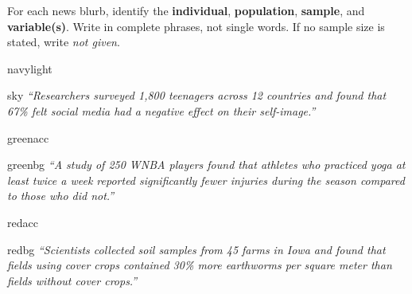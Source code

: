 \documentclass[10pt]{article}
\begin{document}
\namedateperiod

\vspace{0.1in}

\begin{tcolorbox}[colback=sky, colframe=navy, boxrule=0.8pt, arc=2mm,
    left=3mm, right=3mm, top=1.5mm, bottom=1.5mm]
\small For each news blurb, identify the \textbf{individual}, \textbf{population},
\textbf{sample}, and \textbf{variable(s)}. Write in complete phrases, not single words.
If no sample size is stated, write \textit{not given}.
\end{tcolorbox}

\vspace{0.14in}

\begin{blurbbox}[Study 1]{navylight}
\begin{headlinebox}{sky}
\small\textit{``Researchers surveyed 1{,}800 teenagers across 12 countries and
found that 67\% felt social media had a negative effect on their self-image.''}
\end{headlinebox}

\vspace{8pt}
\componenttable
\end{blurbbox}

\vspace{0.14in}

\begin{blurbbox}[Study 2]{greenacc}
\begin{headlinebox}{greenbg}
\small\textit{``A study of 250 WNBA players found that athletes who practiced
yoga at least twice a week reported significantly fewer injuries during the season
compared to those who did not.''}
\end{headlinebox}

\vspace{8pt}
\componenttable
\end{blurbbox}

\vspace{0.14in}

\begin{blurbbox}[Study 3]{redacc}
\begin{headlinebox}{redbg}
\small\textit{``Scientists collected soil samples from 45 farms in Iowa and
found that fields using cover crops contained 30\% more earthworms per square
meter than fields without cover crops.''}
\end{headlinebox}

\vspace{8pt}
\componenttable
\end{blurbbox}
\end{document}
